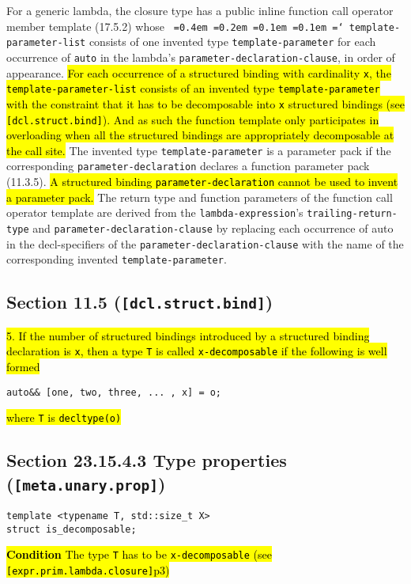 \documentclass{article}
\DeclareRobustCommand{\hlgreen}[1]{{\sethlcolor{green}\hl{#1}}}
\newcommand*\justify{%
  \fontdimen2\font=0.4em%
  \fontdimen3\font=0.2em%
  \fontdimen4\font=0.1em%
  \fontdimen7\font=0.1em%
  \hyphenchar\font=`\-%
}
\begin{document}
For a generic lambda, the closure type has a public inline function call
operator member template (17.5.2) whose \texttt{\justify template-parameter-list}
consists of one invented type \texttt{template-parameter} for each occurrence
of \texttt{auto} in the lambda’s \texttt{parameter-declaration-clause}, in
order of appearance.  \hlgreen{For each occurrence of a structured binding with
cardinality \texttt{x}, the \texttt{template-parameter-list} consists of an
invented type \texttt{template-parameter} with the constraint that it has to
be decomposable into \texttt{x} structured bindings (see
\texttt{[dcl.struct.bind]}).  And as such the function template only
participates in overloading when all the structured bindings are appropriately
decomposable at the call site.} The invented type \texttt{template-parameter}
is a parameter pack if the corresponding \texttt{parameter-declaration}
declares a function parameter pack (11.3.5).  \hlgreen{A structured binding
\texttt{parameter-declaration} cannot be used to invent a parameter pack.} The
return type and function parameters of the function call operator template are
derived from the \texttt{lambda-expression}’s \texttt{trailing-return-type}
and \texttt{parameter-declaration-clause} by replacing each occurrence of auto
in the decl-specifiers of the \texttt{parameter-declaration-clause} with the
name of the corresponding invented \texttt{template-parameter}.


\subsection{Section 11.5 (\texttt{[dcl.struct.bind]})}

\hlgreen{5.  If the number of structured bindings introduced by a structured
binding declaration is \texttt{x}, then a type \texttt{T} is called
\texttt{x-decomposable} if the following is well formed}
\begin{lstlisting}
auto&& [one, two, three, ... , x] = o;
\end{lstlisting}

\hlgreen{where \texttt{T} is \texttt{decltype(o)}}

\subsection{Section 23.15.4.3 Type properties (\texttt{[meta.unary.prop]})}

\begin{lstlisting}
template <typename T, std::size_t X>
struct is_decomposable;
\end{lstlisting}

\hlgreen{\textbf{Condition} The type \texttt{T} has to be
\texttt{x-decomposable} (see \texttt{[expr.prim.lambda.closure]}p3)}
\end{document}
